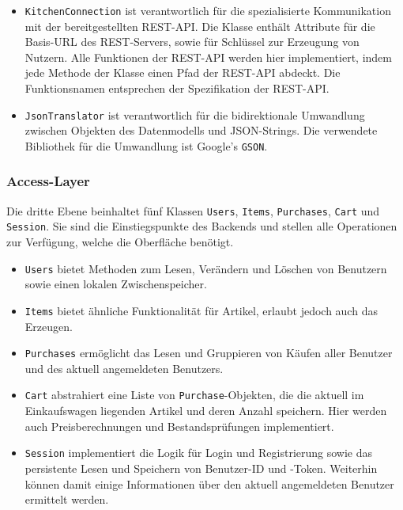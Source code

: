 \begin{itemize}
	\item  \texttt{KitchenConnection} ist verantwortlich für die spezialisierte Kommunikation mit der bereitgestellten REST-API. Die Klasse enthält Attribute für die Basis-URL des REST-Servers, sowie für Schlüssel zur Erzeugung von Nutzern.
	Alle Funktionen der REST-API werden hier implementiert, indem jede Methode der Klasse einen Pfad der REST-API abdeckt.
	Die Funktionsnamen entsprechen der Spezifikation der REST-API\@.

	\item \texttt{JsonTranslator} ist verantwortlich für die bidirektionale Umwandlung zwischen Objekten des Datenmodells und JSON-Strings.
	Die verwendete Bibliothek für die Umwandlung ist Google's \texttt{GSON}.
\end{itemize}

\subsubsection{Access-Layer} \label{subsubsec:access-layer}

Die dritte Ebene beinhaltet fünf Klassen \texttt{Users}, \texttt{Items}, \texttt{Purchases}, \texttt{Cart} und \texttt{Session}.
Sie sind die Einstiegspunkte des Backends und stellen alle Operationen zur Verfügung, welche die Oberfläche benötigt.

\begin{itemize}
	\item \texttt{Users} bietet Methoden zum Lesen, Verändern und Löschen von Benutzern sowie einen lokalen Zwischenspeicher.
	\item \texttt{Items} bietet ähnliche Funktionalität für Artikel, erlaubt jedoch auch das Erzeugen.
	\item \texttt{Purchases} ermöglicht das Lesen und Gruppieren von Käufen aller Benutzer und des aktuell angemeldeten Benutzers.
	\item \texttt{Cart} abstrahiert eine Liste von \texttt{Purchase}-Objekten, die die aktuell im Einkaufswagen liegenden Artikel und deren Anzahl speichern.
	Hier werden auch Preisberechnungen und Bestandsprüfungen implementiert.
	\item \texttt{Session} implementiert die Logik für Login und Registrierung sowie das persistente Lesen und Speichern von Benutzer-ID und -Token.
	Weiterhin können damit einige Informationen über den aktuell angemeldeten Benutzer ermittelt werden.
\end{itemize}

